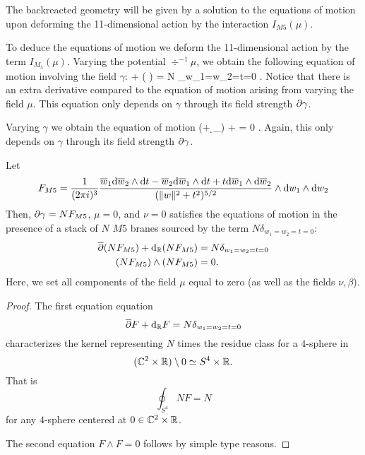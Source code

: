 \parsec[s:m5backreact]

The backreacted geometry will be given by a solution to the equations of motion upon deforming the 11-dimensional action by the interaction $I_{M5}(\mu)$. 

To deduce the equations of motion we deform the 11-dimensional action by the term $I_{M_5}(\mu)$.
Varying the potential $\div^{-1} \mu$, we obtain the following equation of motion involving the field $\gamma$:
\beqn\label{eqn:m5eom1}
\dbar \del \gamma + \div \left( \mu\right) \wedge \del \gamma = N \delta_{w_1=w_2=t=0} .
\eeqn
Notice that there is an extra derivative compared to the equation of motion arising from varying the field $\mu$. 
This equation only depends on $\gamma$ through its field strength $\partial \gamma$. 

Varying $\gamma$ we obtain the equation of motion 
\beqn\label{eqn:m5eom2}
(\dbar + \d_\RR) \mu + \del \gamma \del \gamma = 0 .
\eeqn 
Again, this only depends on $\gamma$ through its field strength $\partial \gamma$.


\begin{lem}
\label{lem:ads7flux}
Let
\[
F_{M5} = \frac{1}{(2\pi i)^3} \frac{\overline{w}_1 {\rm d} \overline{w}_2 \wedge {\rm d} t - \overline{w}_2 {\rm d} \overline{w}_1 \wedge {\rm d} t + t {\rm d} \overline{w}_1 \wedge {\rm d} \overline{w}_2}{(\|w\|^2 + t^2)^{5/2}} \wedge {\rm d} w_1 \wedge {\rm d} w_2
\]
Then, $\partial\gamma = N F_{M5}$, $\mu = 0$, and $\nu = 0$ satisfies the equations of motion in the presence of a stack of $N$ $M5$ branes sourced by the term $N \delta_{w_1=w_2=t=0}$:
\begin{align*}
\overline{\partial} (NF_{M5}) + {\rm d}_{\mathbb R} (NF_{M5}) & = N \delta_{w_1=w_2=t=0}  \\ 
(NF_{M5}) \wedge (NF_{M5}) & = 0 .
\end{align*}
Here, we set all components of the field $\mu$ equal to zero (as well as the fields $\nu,\beta$). 
\end{lem}

\begin{proof}
The first equation equation 
\[
\overline{\partial} F + {\rm d}_{\mathbb R} F = N \delta_{w_1=w_2=t=0}
\]
characterizes the kernel representing $N$ times the residue class for a $4$-sphere in 
\[
(\mathbb C^2 \times \mathbb R) \setminus 0 \simeq S^4 \times \mathbb R .
\] 
That is
\[
\oint_{S^4} N F = N 
\]
for any $4$-sphere centered at $0 \in \mathbb C^2 \times \mathbb R$.

The second equation $F \wedge F = 0$ follows by simple type reasons. 
\end{proof}

